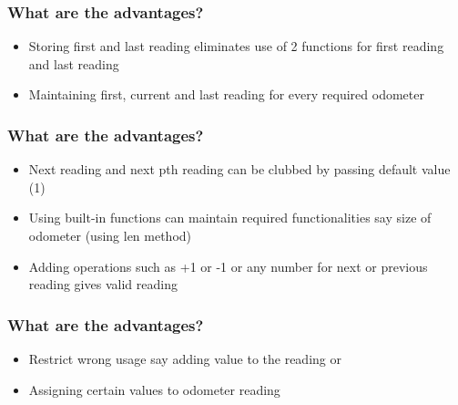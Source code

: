 \documentclass[14pt]{beamer}
\begin{document}
    \begin{frame}[containsverbatim]
        \frametitle{What are the advantages?}
        \begin{itemize}
        \item Storing first and last reading eliminates use of 2 functions for first reading and last reading
        \item Maintaining first, current and last reading for every required odometer
        \end{itemize}
    \end{frame}

    \begin{frame}[containsverbatim]
        \frametitle{What are the advantages?}
        \begin{itemize}
        \item Next reading and next pth reading can be clubbed by passing default value (1)
        \item Using built-in functions can maintain required functionalities say size of odometer (using len method)
        \item Adding operations such as +1 or -1 or any number for next or previous reading gives valid reading
        \end{itemize}
    \end{frame}

    \begin{frame}[containsverbatim]
        \frametitle{What are the advantages?}
        \begin{itemize}
        \item Restrict wrong usage say adding value to the reading or
        \item Assigning certain values to odometer reading
        \end{itemize}
    \end{frame}
\end{document}

